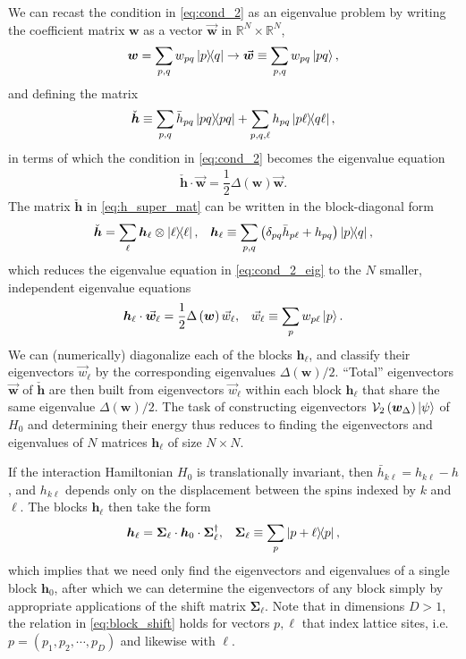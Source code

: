 \documentclass[nofootinbib,notitlepage,11pt]{revtex4-2}
\newcommand{\f}[2]{\dfrac{#1}{#2}} %
\newcommand{\p}[1]{\left(#1\right)} %
\renewcommand{\c}{\cdot} %
\newcommand{\m}{\bm} %
\renewcommand{\v}{\vec} %
\newcommand{\1}{\mathds{1}}
\newcommand{\V}{\mathcal{V}}
\newcommand{\RR}{\mathbb{R}}
\begin{document}
We can recast the condition in \eqref{eq:cond_2} as an eigenvalue
problem by writing the coefficient matrix $\m w$ as a vector
$\v{\m w}$ in $\RR^N\times\RR^N$,
\begin{align}
  \m w = \sum_{p,q} w_{pq} \op{p}{q}
  \to \v{\m w} \equiv \sum_{p,q} w_{pq} \ket{pq},
\end{align}
and defining the matrix
\begin{align}
  \check{\m h}
  \equiv \sum_{p,q} \bar h_{pq} \op{pq}
  + \sum_{p,q,\ell} h_{pq} \op{p\ell}{q\ell},
  \label{eq:h_super_mat}
\end{align}
in terms of which the condition in \eqref{eq:cond_2} becomes the
eigenvalue equation
\begin{align}
  \check{\m h} \c \v{\m w} = \f12 \Delta\p{\m w} \v{\m w}.
  \label{eq:cond_2_eig}
\end{align}
The matrix $\check{\m h}$ in \eqref{eq:h_super_mat} can be written in
the block-diagonal form
\begin{align}
  \check{\m h} = \sum_\ell \m h_\ell \otimes \op{\ell},
  &&
  \m h_\ell
  \equiv \sum_{p,q}\p{\delta_{pq} \bar h_{p\ell} + h_{pq}} \op{p}{q},
\end{align}
which reduces the eigenvalue equation in \eqref{eq:cond_2_eig} to the
$N$ smaller, independent eigenvalue equations
\begin{align}
  \m h_\ell \c \v{\m w}_\ell = \f12 \Delta\p{\m w} \v w_\ell,
  &&
  \v w_\ell \equiv \sum_p w_{p\ell} \ket{p}.
  \label{eq:cond_2_eig_block}
\end{align}
We can (numerically) diagonalize each of the blocks $\m h_\ell$, and
classify their eigenvectors $\v w_\ell$ by the corresponding
eigenvalues $\Delta\p{\m w}/2$.  ``Total'' eigenvectors $\v{\m w}$ of
$\check{\m h}$ are then built from eigenvectors $\v w_\ell$ within
each block $\m h_\ell$ that share the same eigenvalue
$\Delta\p{\m w}/2$.  The task of constructing eigenvectors
$\V_2\p{\m w_\Delta}\ket\psi$ of $H_0$ and determining their energy
thus reduces to finding the eigenvectors and eigenvalues of $N$
matrices $\m h_\ell$ of size $N\times N$.

If the interaction Hamiltonian $H_0$ is translationally invariant,
then $\bar h_{k\ell}=h_{k\ell}-h$, and $h_{k\ell}$ depends only on the
displacement between the spins indexed by $k$ and $\ell$.  The blocks
$\m h_\ell$ then take the form
\begin{align}
  \m h_{\ell} = \m\Sigma_\ell \c \m h_0 \c \m\Sigma_\ell^\dag,
  &&
  \m\Sigma_\ell \equiv \sum_p \op{p+\ell}{p},
  \label{eq:block_shift}
\end{align}
which implies that we need only find the eigenvectors and eigenvalues
of a single block $\m h_0$, after which we can determine the
eigenvectors of any block simply by appropriate applications of the
shift matrix $\m\Sigma_\ell$.  Note that in dimensions $D>1$, the
relation in \eqref{eq:block_shift} holds for vectors $p,\ell$ that
index lattice sites, i.e.~$p=\p{p_1,p_2,\cdots,p_D}$ and likewise with
$\ell$.
\end{document}

